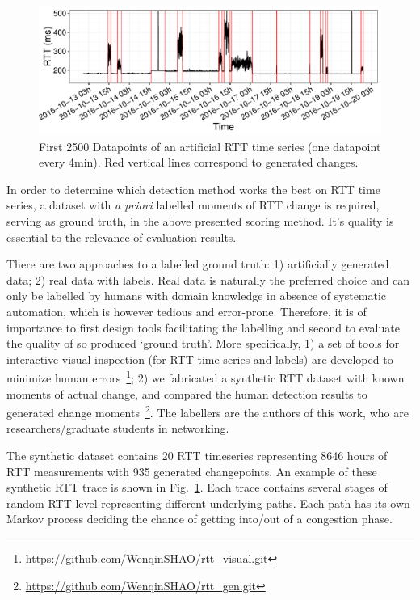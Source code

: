 \begin{figure}[!htb]
\centering
\includegraphics[width=.96\textwidth]{gfx/chap4/artificial_trace.pdf}
\caption{First 2500 %
Datapoints of an artificial RTT time series (one datapoint every 4min). 
Red vertical lines correspond to generated changes.}
\label{fig:art_example}
\end{figure}

In order to determine which detection method works the best on RTT time series, 
a dataset with \textit{a priori} labelled moments of RTT change is required, serving as ground truth, in the above presented scoring method. It's quality is essential to the relevance of evaluation results.

There are two approaches to a labelled ground truth: 1) artificially generated data; 2) real data with labels.
Real data is naturally the preferred choice and 
can only be labelled by humans with domain knowledge in absence of systematic automation, which is however tedious and error-prone. 
Therefore, it is of importance to first design tools facilitating the labelling and second to evaluate the quality of so produced `ground truth'.
More specifically, 1) a set of tools for interactive visual inspection (for RTT time series and labels) are developed to minimize human errors~\footnote{\url{https://github.com/WenqinSHAO/rtt_visual.git}}; 2) we fabricated a synthetic RTT dataset with known moments of actual change, and compared the human detection results to generated change moments~\footnote{\url{https://github.com/WenqinSHAO/rtt_gen.git}}. The labellers are the authors of this work, who are researchers/graduate students in networking. 

The synthetic dataset contains 20 RTT timeseries %
representing 8646 hours of RTT measurements with 935 generated changepoints.
An example of these synthetic RTT trace is shown in Fig.~\ref{fig:art_example}.
Each trace contains several stages of random RTT level representing different underlying paths.
Each path has its own Markov process deciding the chance of getting into/out of a congestion phase. 

